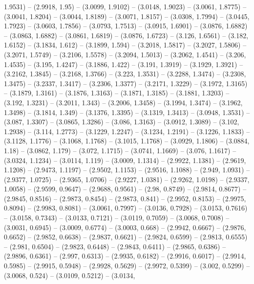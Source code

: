{   1.9531) -- (2.9918, 1.95) -- (3.0099, 1.9102) -- (3.0148, 1.9023) -- (3.0061,
   1.8775) -- (3.0041, 1.8204) -- (3.0044, 1.8189) -- (3.0071, 1.8157) -- 
  (3.0308, 1.7994) -- (3.0445, 1.7923) -- (3.0603, 1.7856) -- (3.0793, 1.7513) 
  -- (3.0915, 1.6901) -- (3.0876, 1.6882) -- (3.0863, 1.6882) -- (3.0861, 
  1.6819) -- (3.0876, 1.6723) -- (3.126, 1.6561) -- (3.182, 1.6152) -- (3.1834, 
  1.612) -- (3.1899, 1.594) -- (3.2018, 1.5817) -- (3.2027, 1.5806) -- (3.2071, 
  1.5749) -- (3.2106, 1.5578) -- (3.2094, 1.5013) -- (3.2062, 1.4541) -- (3.206,
   1.4535) -- (3.195, 1.4247) -- (3.1886, 1.422) -- (3.191, 1.3919) -- (3.1929, 
  1.3921) -- (3.2162, 1.3845) -- (3.2168, 1.3766) -- (3.223, 1.3531) -- (3.2288,
   1.3474) -- (3.2308, 1.3475) -- (3.2337, 1.3417) -- (3.2306, 1.3377) -- 
  (3.2171, 1.3229) -- (3.1972, 1.3165) -- (3.1879, 1.3161) -- (3.1876, 1.3163) 
  -- (3.1871, 1.3185) -- (3.1881, 1.3203) -- (3.192, 1.3231) -- (3.2011, 1.343) 
  -- (3.2006, 1.3458) -- (3.1994, 1.3474) -- (3.1962, 1.3498) -- (3.1814, 1.349)
   -- (3.1376, 1.3395) -- (3.1319, 1.3413) -- (3.0948, 1.3531) -- (3.087, 
  1.3307) -- (3.0865, 1.3286) -- (3.086, 1.3163) -- (3.0912, 1.3089) -- (3.102, 
  1.2938) -- (3.114, 1.2773) -- (3.1229, 1.2247) -- (3.1234, 1.2191) -- (3.1226,
   1.1833) -- (3.1128, 1.1776) -- (3.1068, 1.1768) -- (3.1015, 1.1768) -- 
  (3.0929, 1.1806) -- (3.0884, 1.18) -- (3.0862, 1.179) -- (3.072, 1.1715) -- 
  (3.0741, 1.1669) -- (3.076, 1.1617) -- (3.0324, 1.1234) -- (3.0114, 1.119) -- 
  (3.0009, 1.1314) -- (2.9922, 1.1381) -- (2.9619, 1.1208) -- (2.9473, 1.1197) 
  -- (2.9502, 1.1153) -- (2.9516, 1.1088) -- (2.949, 1.0931) -- (2.9377, 1.0725)
   -- (2.9365, 1.0706) -- (2.9227, 1.0381) -- (2.9262, 1.0198) -- (2.9337, 
  1.0058) -- (2.9599, 0.9647) -- (2.9688, 0.9561) -- (2.98, 0.8749) -- (2.9814, 
  0.8677) -- (2.9845, 0.8516) -- (2.9873, 0.8454) -- (2.9873, 0.841) -- (2.9952,
   0.8153) -- (2.9975, 0.8094) -- (2.9983, 0.8081) -- (3.0061, 0.7997) -- 
  (3.0136, 0.7928) -- (3.0153, 0.7616) -- (3.0158, 0.7343) -- (3.0133, 0.7121) 
  -- (3.0119, 0.7059) -- (3.0068, 0.7008) -- (3.0031, 0.6945) -- (3.0009, 
  0.6774) -- (3.0003, 0.668) -- (2.9942, 0.6667) -- (2.9876, 0.6652) -- (2.9852,
   0.6638) -- (2.9837, 0.6621) -- (2.9824, 0.6599) -- (2.9813, 0.6555) -- 
  (2.981, 0.6504) -- (2.9823, 0.6448) -- (2.9843, 0.6411) -- (2.9865, 0.6386) --
   (2.9896, 0.6361) -- (2.997, 0.6313) -- (2.9935, 0.6182) -- (2.9916, 0.6017) 
  -- (2.9914, 0.5985) -- (2.9915, 0.5948) -- (2.9928, 0.5629) -- (2.9972, 
  0.5399) -- (3.002, 0.5299) -- (3.0068, 0.524) -- (3.0109, 0.5212) -- (3.0134, 
}
